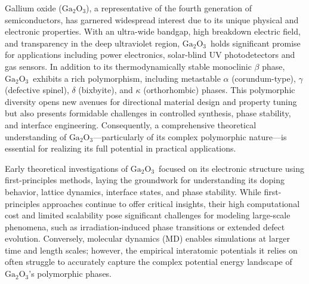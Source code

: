 \documentclass[aip,graphicx,amsmath,amssymb]{revtex4-1}
\newcommand{\ga}{$\text{Ga}_2\text{O}_3$}
\begin{document}
Gallium oxide (\ga), a representative of the fourth generation of 
semiconductors, has garnered widespread interest due to its unique physical and 
electronic properties.\cite{pearton_review_2017} 
With an ultra-wide bandgap, high breakdown electric field, and transparency in the 
deep ultraviolet region, \ga\ holds significant promise for applications including power 
electronics,\cite{tadjer_toward_2022} solar-blind UV photodetectors\cite{pratiyush2019advances} 
and gas sensors.\cite{zhu_gallium_2022} 
In addition to its thermodynamically stable monoclinic $\beta$ phase, \ga\ exhibits a 
rich polymorphism, including metastable $\alpha$ (corundum-type), $\gamma$ 
(defective spinel), $\delta$ (bixbyite), and $\kappa$ (orthorhombic) phases.\cite{yoshioka_structures_2007} 
This polymorphic diversity opens new avenues for directional material design and property 
tuning but also presents formidable challenges in controlled synthesis, phase stability, 
and interface engineering.
Consequently, a comprehensive theoretical understanding of \ga---particularly of its 
complex polymorphic nature---is essential for realizing its full potential in practical 
applications.

Early theoretical investigations of \ga\ focused on its electronic structure 
using first-principles methods,\cite{he_first-principles_2006,xu_structure_2007,yoshioka_structures_2007} 
laying the groundwork for understanding its doping behavior,\cite{varley_oxygen_2010} 
lattice dynamics,\cite{yan_phonon_2018,yang_lattice_2024}
interface states,\cite{bermudez_structure_2006} and phase stability.\cite{fan_low-energy_2022} 
While first-principles approaches continue to offer critical insights, their high computational 
cost and limited scalability pose significant challenges for modeling large-scale phenomena, 
such as irradiation-induced phase transitions or extended defect evolution.\cite{azarov_disorder-induced_2021,han_unraveling_2025} 
Conversely, molecular dynamics (MD) enables simulations at larger time 
and length scales; however, the empirical interatomic potentials 
it relies on often struggle to accurately capture the complex potential energy landscape of 
\ga's polymorphic phases.\cite{blanco_energetics_2005} 
\end{document}
